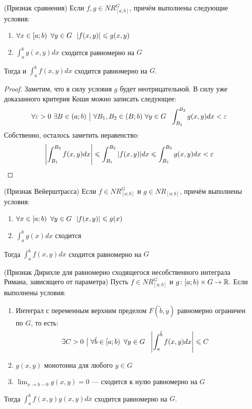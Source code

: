 \begin{theorem} (Признак сравнения)
	Если $f, g \in NR_{[a; b]}^G$, причём выполнены следующие условия:
	\begin{enumerate}
		\item $\forall x \in \left[a; b\right)\ \forall y \in G\ \ |f(x, y)| \leqslant g(x, y)$
		
		\item $\int_a^b g(x, y)dx$ сходится равномерно на $G$
	\end{enumerate}
	Тогда и $\int_a^b f(x, y)dx$ сходится равномерно на $G$.
\end{theorem}

\begin{proof}
	Заметим, что в силу условия $g$ будет неотрицательной. В силу уже доказанного критерия Коши можно записать следующее:
	\[
		\forall \eps > 0\ \exists B \in (a; b) \such \forall B_1, B_2 \in (B; b) \ \forall y \in G\ \ \int_{B_1}^{B_2} g(x, y)dx < \eps
	\]
	Собственно, осталось заметить неравенство:
	\[
		\left|\int_{B_1}^{B_2} f(x, y)dx\right| \leqslant \int_{B_1}^{B_2} |f(x, y)|dx \leqslant \int_{B_1}^{B_2} g(x, y)dx < \varepsilon
	\]
\end{proof}

\begin{corollary} (Признак Вейерштрасса)
	Если $f \in NR_{[a; b]}^G$ и $g \in NR_{[a; b]}$, причём выполнены условия:
	\begin{enumerate}
		\item $\forall x \in \left[a; b\right)\ \forall y \in G\ \ |f(x, y)| \leqslant g(x)$
		
		\item $\int_a^b g(x)dx$ сходится
	\end{enumerate}
	Тогда $\int_a^b f(x, y)dx$ сходится равномерно на $G$
\end{corollary}

\begin{theorem} (Признак Дирихле для равномерно сходящегося несобственного интеграла Римана, зависящего от параметра)
	Пусть $f \in NR_{[a; b]}^G$ и $g \colon [a; b) \times G \to \mathbb{R}$. Если выполнены условия:
	\begin{enumerate}
		\item Интеграл с переменным верхним пределом $F(\tilde{b}, y)$ равномерно ограничен по $G$, то есть:
		\[
			\exists C > 0 \ \big|\  \forall \tilde{b} \in \left[a; b\right)\ \forall y \in G\ \ \left|\int_a^{\tilde{b}} f(x, y) dx\right| \leqslant C
		\]
	
		\item $g(x, y)$ монотонна для любого $y \in G$
		
		\item $\lim_{x \to b-0} g(x, y) = 0$ --- сходится к нулю равномерно на $G$
	\end{enumerate}
	Тогда $\int_a^b f(x, y)g(x, y)dx$ сходится равномерно на $G$.
\end{theorem}

